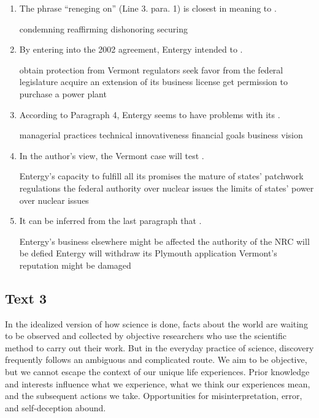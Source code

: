 \begin{enumerate}[resume]
	\item
The phrase ``reneging on'' (Line 3. para. 1) is closest in
meaning to \lineread.


\fourchoices
{condemning}
{reaffirming}
{dishonoring}
{securing}



\item
By entering into the 2002 agreement, Entergy intended to \lineread.


\fourchoices
{obtain protection from Vermont regulators}
{seek favor from the federal legislature}
{acquire an extension of its business license}
{get permission to purchase a power plant}


\item
According to Paragraph 4, Entergy seems to have problems
with its \lineread.


\fourchoices
{managerial practices}
{technical innovativeness}
{financial goals}
{business vision}



\item
 In the author's view, the Vermont case will test \lineread.


\fourchoices
{Entergy's capacity to fulfill all its promises}
{the mature of states' patchwork regulations}
{the federal authority over nuclear issues}
{the limits of states' power over nuclear issues}



\item
It can be inferred from the last paragraph that \lineread.


\fourchoices
{Entergy's business elsewhere might be affected}
{the authority of the NRC will be defied}
{Entergy will withdraw its Plymouth application}
{Vermont's reputation might be damaged}

	
\end{enumerate}



\newpage
\subsection{Text 3}


In the idealized version of how science is done, facts about the world
are waiting to be observed and collected by objective researchers who
use the scientific method to carry out their work. But in the everyday
practice of science, discovery frequently follows an ambiguous and
complicated route. We aim to be objective, but we cannot escape the
context of our unique life experiences. Prior knowledge and interests
influence what we experience, what we think our experiences mean, and
the subsequent actions we take. Opportunities for misinterpretation,
error, and self-deception abound.

